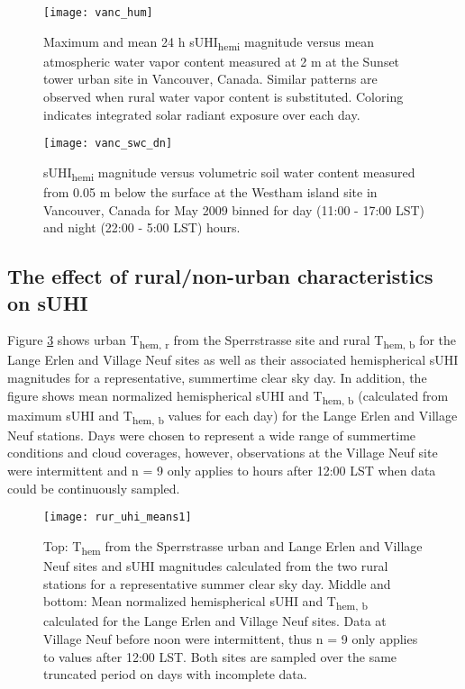 \begin{bibunit}
\begin{figure}[H]
	\centering
	\texttt{[image: vanc\_hum]}
	\caption{Maximum and mean 24 \si{\hour} sUHI\textsubscript{hemi} magnitude versus mean atmospheric water vapor content measured at 2 \si{\meter} at the Sunset tower urban site in Vancouver, Canada. Similar patterns are observed when rural water vapor content is substituted. Coloring indicates integrated solar radiant exposure over each day.}
	\label{vanc_hum}
\end{figure}

\begin{figure}[H]
	\centering
	\texttt{[image: vanc\_swc\_dn]}
	\caption{sUHI\textsubscript{hemi} magnitude versus volumetric soil water content measured from 0.05 \si{\meter} below the surface at the Westham island site in Vancouver, Canada for May 2009 binned for day (11:00 - 17:00 LST) and night (22:00 - 5:00 LST) hours.}
	\label{vanc_swc}
\end{figure}

\pagebreak

\subsection{The effect of rural/non-urban characteristics on sUHI}

Figure \ref{rur_uhi_means} shows urban T\textsubscript{hem, r} from the Sperrstrasse site and rural T\textsubscript{hem, b} for the Lange Erlen and Village Neuf sites as well as their associated hemispherical sUHI magnitudes for a representative, summertime clear sky day. In addition, the figure shows mean normalized hemispherical sUHI and T\textsubscript{hem, b} (calculated from maximum sUHI and T\textsubscript{hem, b} values for each day) for the Lange Erlen and Village Neuf stations. Days were chosen to represent a wide range of summertime conditions and cloud coverages, however, observations at the Village Neuf site were intermittent and n = 9 only applies to hours after 12:00 LST when data could be continuously sampled.

\begin{figure}[H]
	\centering
	\texttt{[image: rur\_uhi\_means1]}
	\caption{Top: T\textsubscript{hem} from the Sperrstrasse urban and Lange Erlen and Village Neuf sites and sUHI magnitudes calculated from the two rural stations for a representative summer clear sky day. Middle and bottom: Mean normalized hemispherical sUHI and T\textsubscript{hem, b} calculated for the Lange Erlen and Village Neuf sites. Data at Village Neuf before noon were intermittent, thus n = 9 only applies to values after 12:00 LST. Both sites are sampled over the same truncated period on days with incomplete data.}
	\label{rur_uhi_means}
\end{figure}


\end{bibunit}
